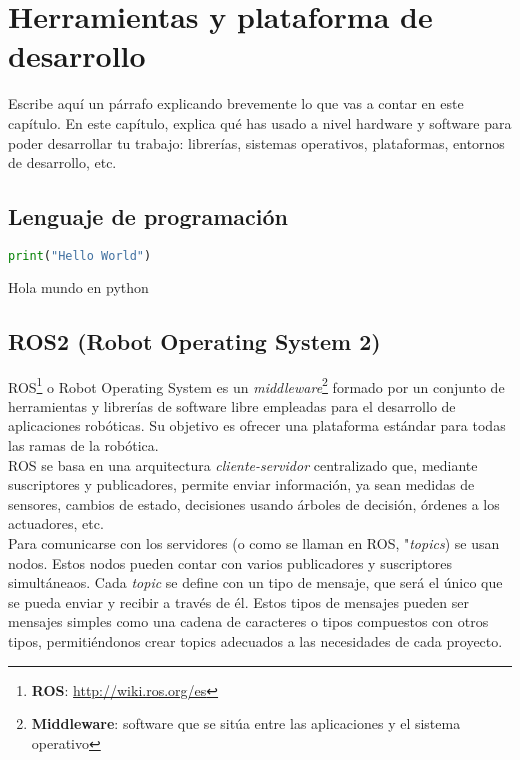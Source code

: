 \chapter{Herramientas y plataforma de desarrollo}
\label{cap:capitulo3}

\vspace{1cm}

Escribe aquí un párrafo explicando brevemente lo que vas a contar en este capítulo. En este capítulo, explica qué has usado a nivel hardware y software para poder desarrollar tu trabajo: librerías, sistemas operativos, plataformas, entornos de desarrollo, etc.

\section{Lenguaje de programación}
\label{sec:lenguaje_programación}

\begin{code}[H]
    \begin{lstlisting}[language=python]
    print("Hello World")
    \end{lstlisting}
    \caption[Hola mundo en python]{Hola mundo en python}
    \label{cod:holamundo_python}
\end{code}


\section{ROS2 (Robot Operating System 2)}
\label{sec:ros2}

ROS\footnote{\textbf{ROS}: \url{http://wiki.ros.org/es}} o Robot Operating System es un \textit{middleware}\footnote{{\textbf{Middleware}: software que se sitúa entre las aplicaciones y el sistema operativo}} formado por un conjunto de herramientas y librerías de software libre empleadas para el desarrollo de aplicaciones robóticas. Su objetivo es ofrecer una plataforma estándar para todas las ramas de la robótica.\\

ROS se basa en una arquitectura \textit{cliente-servidor} centralizado que, mediante suscriptores y publicadores, permite enviar información, ya sean medidas de sensores, cambios de estado, decisiones usando árboles de decisión, órdenes a los actuadores, etc.\\

Para comunicarse con los servidores (o como se llaman en ROS, "\textit{topics}) se usan nodos. Estos nodos pueden contar con varios publicadores y suscriptores simultáneaos.
Cada \textit{topic} se define con un tipo de mensaje, que será el único que se pueda enviar y recibir a través de él. Estos tipos de mensajes pueden ser mensajes simples como una cadena de caracteres o tipos compuestos con otros tipos, permitiéndonos crear topics adecuados a las necesidades de cada proyecto.\\

